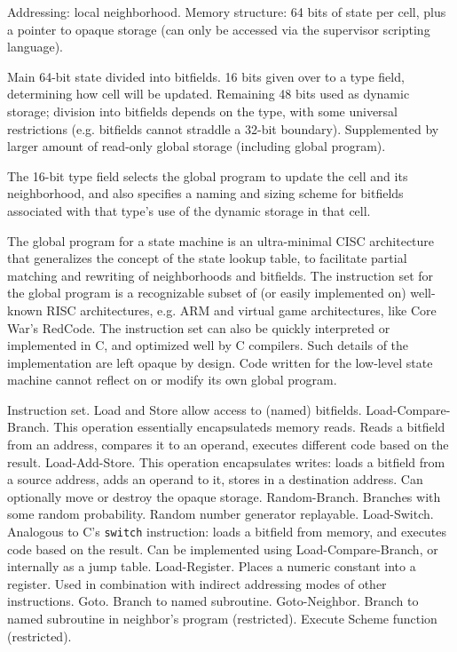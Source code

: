 \documentclass{acm_proc_article-sp}
\begin{document}
Addressing: local neighborhood.
Memory structure: 64 bits of state per cell, plus a pointer to opaque storage (can only be accessed via the supervisor scripting language).

Main 64-bit state divided into bitfields. 16 bits given over to a type field, determining how cell will be updated.
Remaining 48 bits used as dynamic storage; division into bitfields depends on the type, with some universal restrictions (e.g. bitfields cannot straddle a 32-bit boundary).
Supplemented by larger amount of read-only global storage (including global program).

The 16-bit type field selects the global program to update the cell and its neighborhood,
and also specifies a naming and sizing scheme for bitfields associated with that type's use of the dynamic storage in that cell.

The global program for a state machine is an ultra-minimal CISC architecture that generalizes the concept of the state lookup table, to facilitate partial matching and rewriting of neighborhoods and bitfields.
The instruction set for the global program is a recognizable subset of (or easily implemented on) well-known RISC architectures, e.g. ARM\cite{seal00} and virtual game architectures, like Core War's RedCode\cite{CoreWarGuidelines84}.
The instruction set can also be quickly interpreted or implemented in C, and optimized well by C compilers.
Such details of the implementation are left opaque by design.
Code written for the low-level state machine cannot reflect on or modify its own global program.

Instruction set.
Load and Store allow access to (named) bitfields.
Load-Compare-Branch. This operation essentially encapsulateds memory reads. Reads a bitfield from an address, compares it to an operand, executes different code based on the result.
Load-Add-Store. This operation encapsulates writes: loads a bitfield from a source address, adds an operand to it, stores in a destination address. Can optionally move or destroy the opaque storage.
Random-Branch. Branches with some random probability. Random number generator replayable.
Load-Switch. Analogous to C's {\tt switch} instruction: loads a bitfield from memory, and executes code based on the result. Can be implemented using Load-Compare-Branch, or internally as a jump table.
Load-Register. Places a numeric constant into a register. Used in combination with indirect addressing modes of other instructions.
Goto. Branch to named subroutine.
Goto-Neighbor. Branch to named subroutine in neighbor's program (restricted).
Execute Scheme function (restricted).
\end{document}
